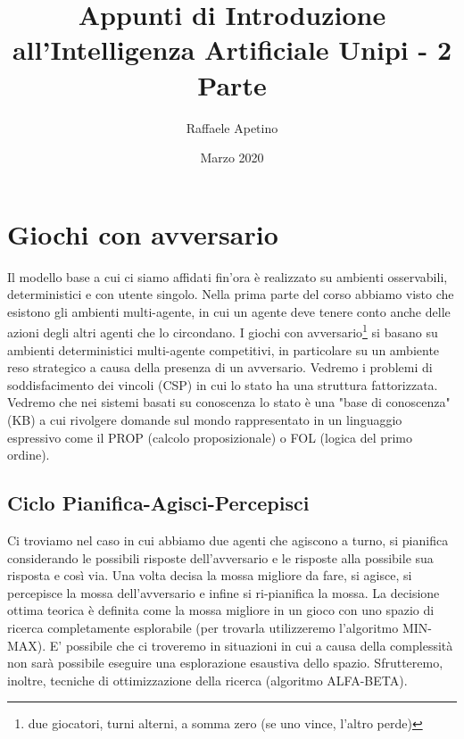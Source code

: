 \documentclass{article}
\title{Appunti di Introduzione all'Intelligenza Artificiale Unipi - 2 Parte}
\author{Raffaele Apetino}
\date{Marzo 2020}
\begin{document}
\maketitle

\tableofcontents{}
\clearpage

\section{Giochi con avversario}
Il modello base a cui ci siamo affidati fin'ora è realizzato su ambienti osservabili, deterministici e con utente singolo. Nella prima parte del corso abbiamo visto che esistono gli ambienti multi-agente, in cui un agente deve tenere conto anche delle azioni degli altri agenti che lo circondano. I giochi con avversario\footnote{due giocatori, turni alterni, a somma zero (se uno vince, l'altro perde)} si basano su ambienti deterministici multi-agente competitivi, in particolare su un ambiente reso strategico a causa della presenza di un avversario. \newline 
Vedremo i problemi di soddisfacimento dei vincoli (CSP) in cui lo stato ha una struttura fattorizzata. Vedremo che nei sistemi basati su conoscenza lo stato è una "base di conoscenza" (KB) a cui rivolgere domande sul mondo rappresentato in un linguaggio espressivo come il PROP (calcolo proposizionale) o FOL (logica del primo ordine). 

\subsection{Ciclo Pianifica-Agisci-Percepisci}
Ci troviamo nel caso in cui abbiamo due agenti che agiscono a turno, si pianifica considerando le possibili risposte dell'avversario e le risposte alla possibile sua risposta e così via. Una volta decisa la mossa migliore da fare, si agisce, si percepisce la mossa dell'avversario e infine si ri-pianifica la mossa. \newline 
La decisione ottima teorica è definita come la mossa migliore in un gioco con uno spazio di ricerca completamente esplorabile (per trovarla utilizzeremo l'algoritmo MIN-MAX). E' possibile che ci troveremo in situazioni in cui a causa della complessità non sarà possibile eseguire una esplorazione esaustiva dello spazio. Sfrutteremo, inoltre, tecniche di ottimizzazione della ricerca (algoritmo ALFA-BETA).
\end{document}
